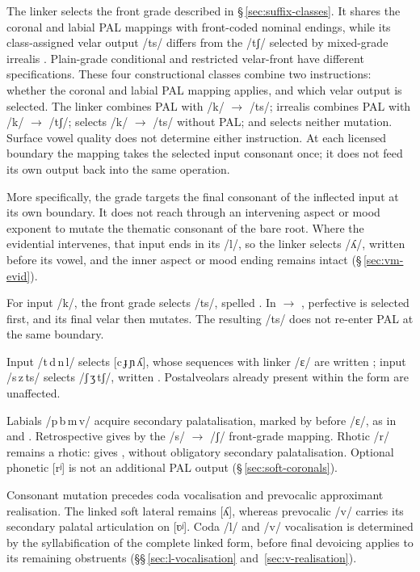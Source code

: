 The linker selects the front grade described in
§\,\ref{sec:suffix-classes}. It shares the coronal and labial PAL mappings
with front-coded nominal endings, while its class-assigned velar output /ts/
differs from the /tʃ/ selected by mixed-grade irrealis .
Plain-grade conditional  and restricted velar-front 
have different specifications. These four constructional classes combine two
instructions: whether the coronal and labial PAL mapping applies, and which
velar output is selected. The linker combines PAL with /k/ $\rightarrow$ /ts/;
irrealis  combines PAL with /k/ $\rightarrow$ /tʃ/;
 selects /k/ $\rightarrow$ /ts/ without PAL; and 
selects neither mutation. Surface vowel quality does not determine either
instruction. At each licensed boundary the mapping takes the selected input
consonant once; it does not feed its own output back into the same operation.

More specifically, the grade targets the final consonant of the inflected
input at its own boundary. It does not reach through an intervening aspect or mood exponent
to mutate the thematic consonant of the bare root. Where the evidential
intervenes, that input ends in its /l/, so the linker selects /ʎ/, written
 before its vowel, and the inner aspect or mood ending remains intact
(§\,\ref{sec:vm-evid}).

For input /k/, the front grade selects /ts/, spelled .
In  $\rightarrow$ , perfective
 is selected first, and its final velar then mutates.
The resulting /ts/ does not re-enter PAL at the same boundary.

Input /t\,d\,n\,l/ selects [c\,ɟ\,ɲ\,ʎ], whose sequences with
linker /ɛ/ are written ; input /s\,z\,ts/ selects /ʃ\,ʒ\,tʃ/, written
.
Postalveolars already present within the form are unaffected.

Labials /p\,b\,m\,v/ acquire secondary palatalisation, marked by
 before /ɛ/, as in  and .
Retrospective  gives  by the
/s/ $\rightarrow$ /ʃ/ front-grade mapping.
Rhotic /r/ remains a rhotic:  gives ,
without obligatory secondary palatalisation. Optional phonetic [rʲ]
is not an additional PAL output (§\,\ref{sec:soft-coronals}).

Consonant mutation precedes coda vocalisation and prevocalic approximant
realisation. The linked soft lateral remains [ʎ], whereas prevocalic /v/ carries its secondary
palatal articulation on [ʋʲ]. Coda /l/ and /v/ vocalisation is determined
by the syllabification of the complete linked form, before final devoicing
applies to its remaining obstruents
(§§\,\ref{sec:l-vocalisation} and~\ref{sec:v-realisation}).

